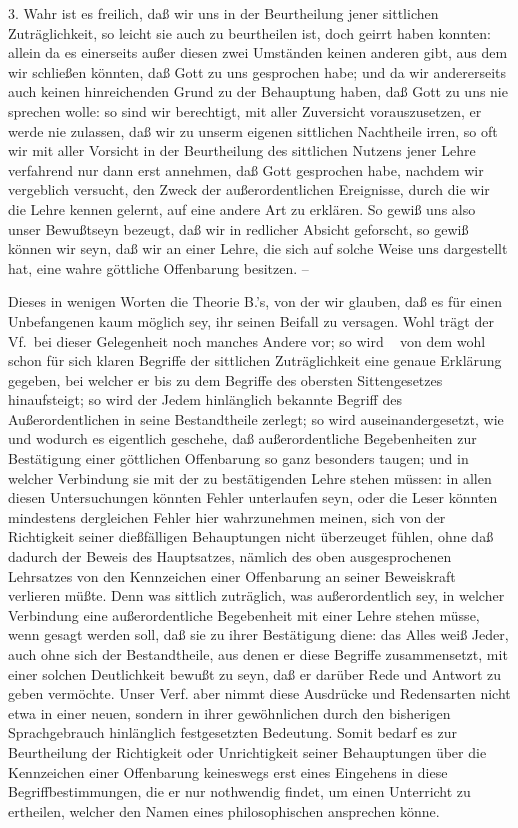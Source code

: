 3. Wahr ist es freilich, daß wir uns in der Beurtheilung jener sittlichen Zuträglichkeit, so leicht sie auch zu beurtheilen ist, doch geirrt haben konnten: allein da es einerseits außer diesen zwei Umständen keinen anderen gibt, aus dem wir schließen könnten, daß Gott zu uns gesprochen habe; und da wir andererseits auch keinen hinreichenden Grund zu der Behauptung haben, daß Gott zu uns nie sprechen wolle: so sind wir berechtigt, mit aller Zuversicht vorauszusetzen, er werde nie zulassen, daß wir zu unserm eigenen sittlichen Nachtheile irren, so oft wir mit aller Vorsicht in der Beurtheilung des sittlichen  Nutzens jener Lehre verfahrend nur dann erst annehmen, daß Gott gesprochen habe, nachdem wir vergeblich versucht, den Zweck der außerordentlichen Ereignisse, durch die wir die Lehre kennen gelernt, auf eine andere Art zu erklären. So gewiß uns also unser Bewußtseyn bezeugt, daß wir in redlicher Absicht geforscht, so gewiß können wir seyn, daß wir an einer Lehre, die sich auf solche Weise uns dargestellt hat, eine wahre göttliche Offenbarung besitzen. --\par
Dieses in wenigen Worten die Theorie B.'s, von der wir glauben, daß es für einen Unbefangenen kaum möglich sey, ihr seinen Beifall zu versagen. Wohl trägt der Vf.\ bei dieser Gelegenheit noch manches Andere vor; so wird \zB\  von dem wohl schon für sich klaren Begriffe der sittlichen Zuträglichkeit eine genaue Erklärung gegeben, bei welcher er bis zu dem Begriffe des obersten Sittengesetzes hinaufsteigt; so wird  der Jedem hinlänglich bekannte Begriff des Außerordentlichen in seine Bestandtheile zerlegt; so wird  auseinandergesetzt, wie und wodurch es eigentlich geschehe, daß außerordentliche Begebenheiten zur Bestätigung einer göttlichen Offenbarung so ganz besonders taugen; und  in welcher Verbindung sie mit der zu bestätigenden Lehre stehen müssen: in allen diesen Untersuchungen könnten Fehler unterlaufen seyn, oder die Leser könnten mindestens dergleichen Fehler hier wahrzunehmen meinen, sich von der Richtigkeit seiner dießfälligen Behauptungen nicht überzeuget fühlen, ohne daß dadurch der Beweis des Hauptsatzes, nämlich des oben ausgesprochenen Lehrsatzes von den Kennzeichen einer Offenbarung an seiner Beweiskraft verlieren müßte. Denn was sittlich zuträglich, was außerordentlich sey, in welcher Verbindung eine außerordentliche Begebenheit mit einer Lehre stehen müsse, wenn gesagt werden soll, daß sie zu ihrer Bestätigung diene: das Alles weiß Jeder, auch ohne sich der Bestandtheile, aus denen er diese Begriffe zusammensetzt, mit einer solchen Deutlichkeit bewußt zu seyn, daß er darüber Rede und Antwort zu geben vermöchte. Unser Verf. aber nimmt diese Ausdrücke und Redensarten nicht etwa in einer neuen, sondern in ihrer gewöhnlichen  durch den bisherigen Sprachgebrauch hinlänglich festgesetzten Bedeutung. Somit bedarf es zur Beurtheilung der Richtigkeit oder Unrichtigkeit seiner Behauptungen über die Kennzeichen einer Offenbarung keineswegs erst eines Eingehens in diese Begriffbestimmungen, die er nur nothwendig findet, um einen Unterricht zu ertheilen, welcher den Namen eines philosophischen ansprechen könne. \par
